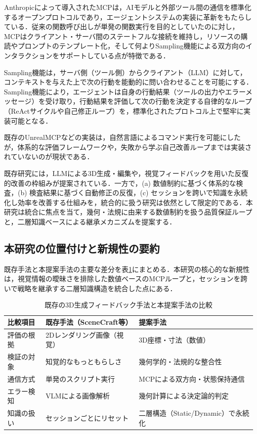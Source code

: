 \documentclass[dvipdfmx, a4paper, 9pt]{deimj}
\begin{document}
Anthropicによって導入されたMCP\cite{anthropic2024mcp}は，AIモデルと外部ツール間の通信を標準化するオープンプロトコルであり，エージェントシステムの実装に革新をもたらしている．従来の関数呼び出しが単発の関数実行を目的としていたのに対し\cite{schick2024toolformer}，MCPはクライアント・サーバ間のステートフルな接続を維持し，リソースの購読やプロンプトのテンプレート化，そして何よりSampling機能による双方向のインタラクションをサポートしている点が特徴である．

Sampling機能は，サーバ側（ツール側）からクライアント（LLM）に対して，コンテキストを与えた上で次の行動を能動的に問い合わせることを可能にする．Sampling機能により，エージェントは自身の行動結果（ツールの出力やエラーメッセージ）を受け取り，行動結果を評価して次の行動を決定する自律的なループ（ReActサイクル\cite{yao2023react}や自己修正ループ\cite{shinn2024reflexion,xi2023rise}）を，標準化されたプロトコル上で堅牢に実装可能となる．

既存のUnrealMCP\cite{unrealmcp2024}などの実装は，自然言語によるコマンド実行を可能にしたが，体系的な評価フレームワークや，失敗から学ぶ自己改善ループまでは実装されていないのが現状である．

既存研究には，LLMによる3D生成・編集や，視覚フィードバックを用いた反復的改善の枠組みが提案されている．一方で，(a) 数値制約に基づく体系的な検査，(b) 検査結果に基づく自動修正の反復，(c) セッションを跨いで知識を永続化し効率を改善する仕組みを，統合的に扱う研究は依然として限定的である．本研究は統合に焦点を当て，幾何・法規に由来する数値制約を扱う品質保証ループと，二層知識ベースによる継承メカニズムを提案する．

\subsection{本研究の位置付けと新規性の要約}

既存手法と本提案手法の主要な差分を表\ref{tab:comparison}にまとめる．本研究の核心的な新規性は，視覚情報の曖昧さを排除した数値ベースのMCPループと，セッションを跨いで戦略を継承する二層知識構造を統合した点にある．

\begin{table}[ht]
  \caption{既存の3D生成フィードバック手法と本提案手法の比較}
  \label{tab:comparison}
  \centering
  \small
  \begin{tabularx}{\columnwidth}{lXX}
    \toprule
    比較項目 & 既存手法（SceneCraft等） & 提案手法\\
    \midrule
    評価の根拠 & 2Dレンダリング画像（視覚） & 3D座標・寸法（数値）\\
    検証の対象 & 知覚的なもっともらしさ & 幾何学的・法規的な整合性\\
    通信方式 & 単発のスクリプト実行 & MCPによる双方向・状態保持通信\\
    エラー検知 & VLMによる画像解析 & 幾何計算による決定論的判定\\
    知識の扱い & セッションごとにリセット & 二層構造（Static/Dynamic）で永続化\\
    \bottomrule
  \end{tabularx}
\end{table}
\end{document}
